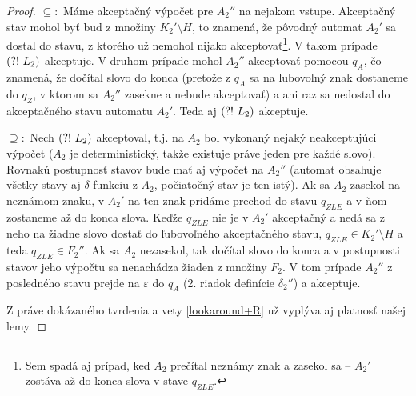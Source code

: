 \begin{proof}
$\subseteq :$ Máme akceptačný výpočet pre $A_2''$ na nejakom vstupe. Akceptačný stav mohol byť buď z množiny $K_2'\setminus H$, to znamená, že pôvodný automat $A_2'$ sa dostal do stavu, z ktorého už nemohol nijako akceptovať\footnote{Sem spadá aj prípad, keď $A_2$ prečítal neznámy znak a zasekol sa -- $A_2'$ zostáva až do konca slova v stave $q_{ZLE}$.}. V takom prípade $\text{(?!~} L_2)$ akceptuje. V druhom prípade mohol $A_2''$ akceptovať pomocou $q_A$, čo znamená, že dočítal slovo do konca (pretože z $q_A$ sa na ľubovoľný znak dostaneme do $q_Z$, v ktorom sa $A_2''$ zasekne a nebude akceptovať) a ani raz sa nedostal do akceptačného stavu automatu $A_2'$. Teda aj $\text{(?!~} L_2)$ akceptuje.

$\supseteq :$ Nech $\text{(?!~} L_2)$ akceptoval, t.j. na $A_2$ bol vykonaný nejaký neakceptujúci výpočet ($A_2$ je deterministický, takže existuje práve jeden pre každé slovo). Rovnakú postupnosť stavov bude mať aj výpočet na $A_2''$ (automat obsahuje všetky stavy aj $\delta$-funkciu z $A_2$, počiatočný stav je ten istý). Ak sa $A_2$ zasekol na neznámom znaku, v $A_2'$ na ten znak pridáme prechod do stavu $q_{ZLE}$ a v ňom zostaneme až do konca slova. Keďže $q_{ZLE}$ nie je v $A_2'$ akceptačný a nedá sa z neho na žiadne slovo dostať do ľubovoľného akceptačného stavu, $q_{ZLE} \in K_2' \setminus H$ a teda $q_{ZLE} \in F_2''$. Ak sa $A_2$ nezasekol, tak dočítal slovo do konca a v postupnosti stavov jeho výpočtu sa nenachádza žiaden z množiny $F_2$. V tom prípade $A_2''$ z posledného stavu prejde na $\varepsilon$ do $q_A$ (2. riadok definície $\delta_2''$) a akceptuje.

Z práve dokázaného tvrdenia a vety \ref{lookaround+R} už vyplýva aj platnosť našej lemy.
\end{proof}

